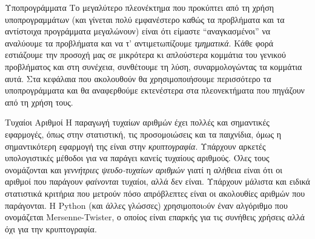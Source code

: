 \documentclass[a4paper,11pt,oneside]{book}
\begin{document}
\begin{theory}{Υποπρογράμματα}
Το μεγαλύτερο πλεονέκτημα που προκύπτει από τη χρήση υποπρογραμμάτων (και γίνεται πολύ εμφανέστερο καθώς τα προβλήματα και τα αντίστοιχα προγράμματα μεγαλώνουν) είναι ότι είμαστε ``αναγκασμένοι'' να αναλύουμε τα προβλήματα και να τ' αντιμετωπίζουμε \emph{τμηματικά}. Κάθε φορά εστιάζουμε την προσοχή μας σε μικρότερα κι απλούστερα κομμάτια του γενικού προβλήματος και στη συνέχεια, συνθέτουμε τη λύση, συναρμολογώντας τα κομμάτια αυτά. Στα κεφάλαια που ακολουθούν θα χρησιμοποιήσουμε περισσότερο τα υποπρογράμματα και θα αναφερθούμε εκτενέστερα στα πλεονεκτήματα που πηγάζουν από τη χρήση τους.




\end{theory}

\begin{theory}{Τυχαίοι Αριθμοί}
Η παραγωγή τυχαίων αριθμών έχει πολλές και σημαντικές εφαρμογές, όπως στην στατιστική, τις προσομοιώσεις και τα παιχνίδια, όμως η σημαντικότερη εφαρμογή της είναι στην \emph{κρυπτογραφία}. Υπάρχουν αρκετές υπολογιστικές μέθοδοι για να παράγει κανείς τυχαίους αριθμούς. Όλες τους ονομάζονται και \emph{γεννήτριες ψευδο-τυχαίων αριθμών} γιατί η αλήθεια είναι ότι οι αριθμοί που παράγουν \emph{φαίνονται} τυχαίοι, αλλά δεν είναι. Υπάρχουν μάλιστα και ειδικά στατιστικά κριτήρια που μετρούν πόσο απρόβλεπτες είναι οι ακολουθίες αριθμών που παράγονται. Η Python (και άλλες γλώσσες) χρησιμοποιoύν έναν αλγόριθμο που ονομάζεται Mersenne-Twister, ο οποίος είναι επαρκής για τις συνήθεις χρήσεις αλλά όχι για την κρυπτογραφία.
\end{theory}

\hrulefill
\end{document}

